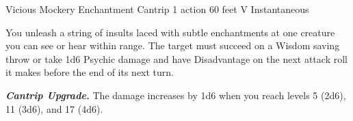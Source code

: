 \DndSpellHeader%
    {Vicious Mockery}
    {Enchantment Cantrip}
    {1 action}
    {60 feet}
    {V}
    {Instantaneous}

You unleash a string of insults laced with subtle enchantments at one creature you can see or hear within range. The target must succeed on a Wisdom saving throw or take 1d6 Psychic damage and have Disadvantage on the next attack roll it makes before the end of its next turn.

\textbf{\textit{Cantrip Upgrade.}} The damage increases by 1d6 when you reach levels 5 (2d6), 11 (3d6), and 17 (4d6).
